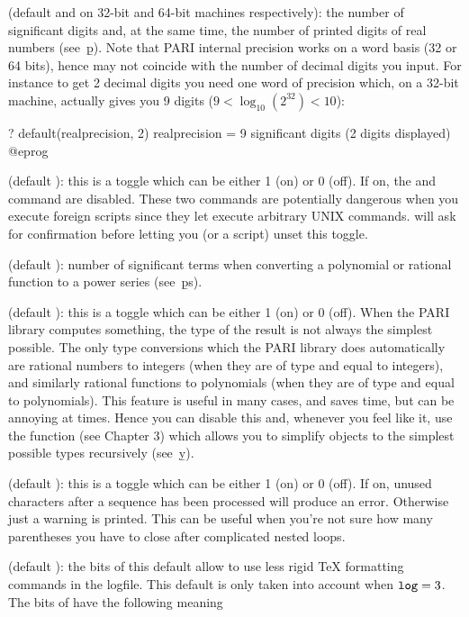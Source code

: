  (default  and  on 32-bit and 64-bit machines respectively): the number of significant digits and, at the same
time, the number of printed digits of real numbers (see~\b{p}). Note that
PARI internal precision works on a word basis (32 or 64 bits), hence may not
coincide with the number of decimal digits you input. For instance to get 2
decimal digits you need one word of precision which, on a 32-bit machine,
actually gives you 9 digits ($9 < \log_{10}(2^{32}) < 10$):

\bprog
? default(realprecision, 2)
      realprecision = 9 significant digits (2 digits displayed)
@eprog

 (default ): this is a toggle which can be either 1
(on) or 0 (off). If on, the  and  command are
disabled. These two commands are potentially dangerous when you execute
foreign scripts since they let  execute arbitrary UNIX commands.
 will
ask for confirmation before letting you (or a script) unset this toggle.

 (default ): number of significant terms
when converting a polynomial or rational function to a power series
(see~\b{ps}).

 (default ): this is a toggle which can be either
1 (on) or 0 (off). When the PARI library computes something, the type of the
result is not always the simplest possible. The only type conversions which
the PARI library does automatically are rational numbers to integers (when
they are of type  and equal to integers), and similarly rational
functions to polynomials (when they are of type  and equal to
polynomials). This feature is useful in many cases, and saves time, but can
be annoying at times. Hence you can disable this and, whenever you feel like
it, use the function  (see Chapter 3) which allows you to
simplify objects to the simplest possible types recursively (see~\b{y}).

 (default ): this is a toggle which can be
either 1 (on) or 0 (off). If on, unused characters after a sequence has been
processed will produce an error. Otherwise just a warning is printed. This
can be useful when you're not sure how many parentheses you have to close after
complicated nested loops.

 (default ): the bits of this default allow
 to use less rigid TeX formatting commands in the logfile. This
default is only taken into account when ${\tt log} = 3$. The bits of
 have the following meaning


